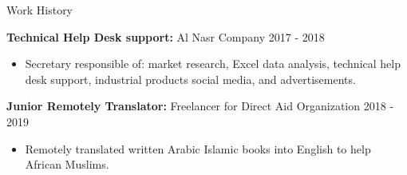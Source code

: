 \documentclass{resume} %
\begin{document}
\begin{rSection}{Work History}
\vspace{-1.25em}
\item \textbf{Technical Help Desk support:} {Al Nasr Company} \hfill 2017 - 2018
  \begin{itemize}
     \itemsep -3pt {} 
      \item  Secretary responsible of: market research, Excel data analysis, technical help desk support, industrial products social media, and advertisements.
 \end{itemize}

\item \textbf{Junior Remotely Translator:} {Freelancer for Direct Aid Organization} \hfill  2018 - 2019
  \begin{itemize}
     \itemsep -3pt {} 
      \item  Remotely translated written Arabic Islamic books into English to help African Muslims.
 \end{itemize}
 
\end{rSection} 

\end{document}
